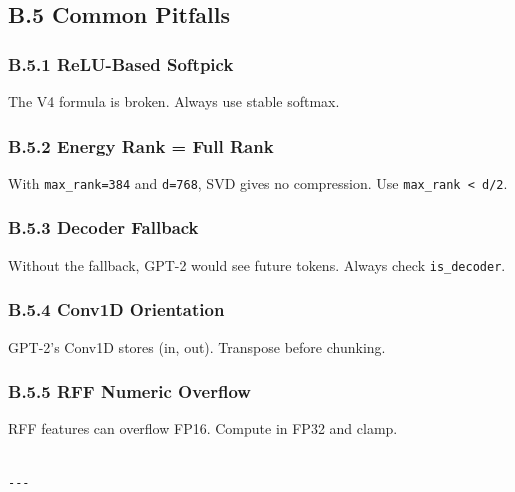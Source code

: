 \subsection{B.5 Common Pitfalls}

\subsubsection{B.5.1 ReLU-Based Softpick}

The V4 formula is broken. Always use stable softmax.

\subsubsection{B.5.2 Energy Rank = Full Rank}

With \texttt{max\_rank=384} and \texttt{d=768}, SVD gives no compression. Use 
\texttt{max\_rank < d/2}.

\subsubsection{B.5.3 Decoder Fallback}

Without the fallback, GPT-2 would see future tokens. Always check 
\texttt{is\_decoder}.

\subsubsection{B.5.4 Conv1D Orientation}

GPT-2's Conv1D stores (in, out). Transpose before chunking.

\subsubsection{B.5.5 RFF Numeric Overflow}

RFF features can overflow FP16. Compute in FP32 and clamp.
\begin{lstlisting}

---
\end{lstlisting}